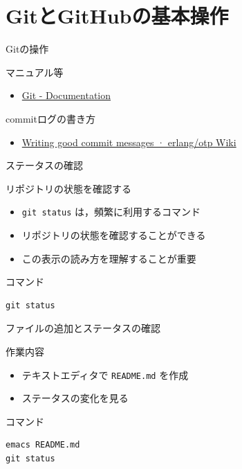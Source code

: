 \documentclass[12pt, t, aspectratio=169]{beamer}
\begin{document}
\section{GitとGitHubの基本操作}
\label{sec-2-4}
\begin{frame}[label=sec-2-4-1]{Gitの操作}
\begin{block}{マニュアル等}
\begin{itemize}
\item \href{http://git-scm.com/doc}{Git - Documentation}
\end{itemize}
\end{block}
\begin{block}{commitログの書き方}
\begin{itemize}
\item \href{https://github.com/erlang/otp/wiki/Writing-good-commit-messages}{Writing good commit messages · erlang/otp Wiki}
\end{itemize}
\end{block}
\end{frame}
\begin{frame}[fragile,label=sec-2-4-2]{ステータスの確認}
 \begin{block}{リポジトリの状態を確認する}
\begin{itemize}
\item \texttt{git status} は，頻繁に利用するコマンド
\item リポジトリの状態を確認することができる
\item この表示の読み方を理解することが重要
\end{itemize}
\end{block}
\begin{block}{コマンド}
\begin{verbatim}
git status
\end{verbatim}
\end{block}
\end{frame}

\begin{frame}[fragile,label=sec-2-4-3]{ファイルの追加とステータスの確認}
 \begin{block}{作業内容}
\begin{itemize}
\item テキストエディタで \texttt{README.md} を作成
\item ステータスの変化を見る
\end{itemize}
\end{block}
\begin{block}{コマンド}
\begin{verbatim}
emacs README.md
git status
\end{verbatim}
\end{block}
\end{frame}
\end{document}

